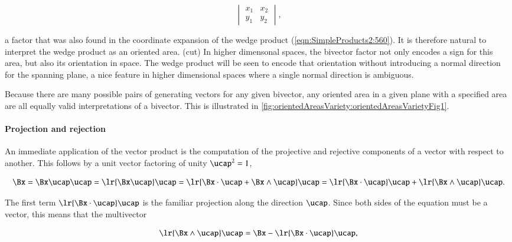 \begin{dmath}\label{eqn:SimpleProducts2:660}
\begin{vmatrix}
   x_1 & x_2 \\
   y_1 & y_2
\end{vmatrix},
\end{dmath}

a factor that was also found in the coordinate expansion of the wedge product (\cref{eqn:SimpleProducts2:560}).
It is therefore natural to interpret the wedge product as an oriented area.
(cut)
In higher dimensonal spaces, the bivector factor not only encodes a sign for this area, but also its orientation in space.
The wedge product will be seen to encode that orientation without introducing a normal direction for the spanning plane, a nice feature in higher dimensional spaces where a single normal direction is ambiguous.

Because there are many possible pairs of generating vectors for any given bivector, any oriented area in a given plane with a specified area are all equally valid interpretations of a bivector.
This is illustrated in \cref{fig:orientedAreasVariety:orientedAreasVarietyFig1}.

\paragraph{Projection and rejection}

An immediate application of the vector product is the computation of the projective and rejective components of a vector with respect to another.
This follows by a unit vector factoring of unity \( \ucap^2 = 1 \),

\begin{dmath}\label{eqn:SimpleProducts2:680}
\Bx =
\Bx \ucap \ucap
=
\lr{ \Bx \ucap } \ucap
=
\lr{ \Bx \cdot \ucap + \Bx \wedge \ucap } \ucap
=
\lr{ \Bx \cdot \ucap } \ucap + \lr{ \Bx \wedge \ucap } \ucap.
\end{dmath}

The first term \( \lr{ \Bx \cdot \ucap } \ucap \) is the familiar projection along the direction \( \ucap \).
Since both sides of the equation must be a vector, this means that the multivector

\begin{dmath}\label{eqn:SimpleProducts2:700}
\lr{ \Bx \wedge \ucap } \ucap
=\Bx - \lr{ \Bx \cdot \ucap } \ucap,
\end{dmath}

